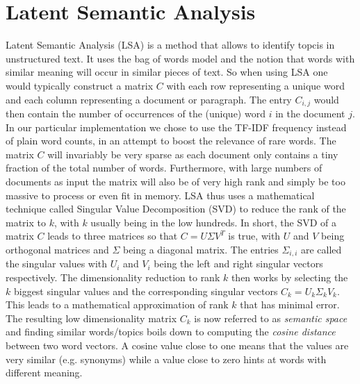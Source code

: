 \section{Latent Semantic Analysis}

Latent Semantic Analysis (LSA) is a method that allows to identify topcis in unstructured text. It uses the bag of words model and the notion that words with similar meaning will occur in similar pieces of text. So when using LSA one would typically construct a matrix $C$  with each row representing a unique word and each column representing a document or paragraph. The entry $C_{i,j}$ would then contain the number of occurrences of the (unique) word $i$ in the document $j$. In our particular implementation we chose to use the TF-IDF frequency instead of plain word counts, in an attempt to boost the relevance of rare words. The matrix $C$ will invariably be very sparse as each document only contains a tiny fraction of the total number of words. Furthermore, with large numbers of documents as input the matrix will also be of very high rank and simply be too massive to process or even fit in memory. LSA thus uses a mathematical technique called Singular Value Decomposition (SVD) to reduce the rank of the matrix to $k$, with $k$ usually being in the low hundreds. In short, the SVD of a matrix $C$ leads to three matrices so that $C = U{\Sigma}V^T$ is true, with $U$ and $V$ being orthogonal matrices and $\Sigma$ being a diagonal matrix. The entries $\Sigma_{i,i}$ are called the singular values with $U_{i}$ and $V_{i}$ being the left and right singular vectors respectively. The dimensionality reduction to rank $k$ then works by selecting the $k$ biggest singular values and the corresponding singular vectors $C_{k} = U_{k}{\Sigma_{k}}V_{k}$. This leads to a mathematical approximation of rank $k$ that has minimal error.
The resulting low dimensionality matrix $C_{k}$ is now referred to as \emph{semantic space} and finding similar words/topics boils down to computing the \emph{cosine distance} between two word vectors. A cosine value close to one means that the values are very similar (e.g. synonyms) while a value close to zero hints at words with different meaning.
